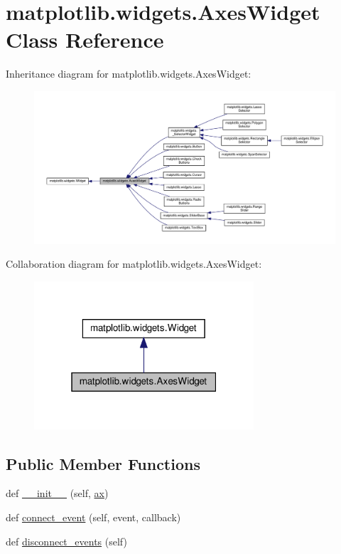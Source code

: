 \hypertarget{classmatplotlib_1_1widgets_1_1AxesWidget}{}\section{matplotlib.\+widgets.\+Axes\+Widget Class Reference}
\label{classmatplotlib_1_1widgets_1_1AxesWidget}


Inheritance diagram for matplotlib.\+widgets.\+Axes\+Widget\+:
\nopagebreak
\begin{figure}[H]
\begin{center}
\leavevmode
\includegraphics[width=350pt]{classmatplotlib_1_1widgets_1_1AxesWidget__inherit__graph}
\end{center}
\end{figure}


Collaboration diagram for matplotlib.\+widgets.\+Axes\+Widget\+:
\nopagebreak
\begin{figure}[H]
\begin{center}
\leavevmode
\includegraphics[width=232pt]{classmatplotlib_1_1widgets_1_1AxesWidget__coll__graph}
\end{center}
\end{figure}
\subsection*{Public Member Functions}
\begin{DoxyCompactItemize}
\item 
def \hyperlink{classmatplotlib_1_1widgets_1_1AxesWidget_af6e9ecdcf48c7bc35137c54ffdb6bfa8}{\+\_\+\+\_\+init\+\_\+\+\_\+} (self, \hyperlink{classmatplotlib_1_1widgets_1_1AxesWidget_ac0722858b7001d10a42055dc90420b4f}{ax})
\item 
def \hyperlink{classmatplotlib_1_1widgets_1_1AxesWidget_a143390178661205845d5b37ec167463a}{connect\+\_\+event} (self, event, callback)
\item 
def \hyperlink{classmatplotlib_1_1widgets_1_1AxesWidget_a8b5b89b292049847edc362431bd538b4}{disconnect\+\_\+events} (self)
\end{DoxyCompactItemize}
